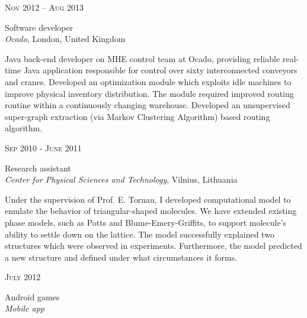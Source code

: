 \documentclass[10pt]{article} %
\begin{document}
{\begin{minipage}[t]{0.5\textwidth}

{\raggedleft\textsc{Nov 2012 – Aug 2013}\par}

{\raggedright\large Software developer\\
\textit{Ocado}, London, United Kingdom\\[5pt]}

\normalsize{Java back-end developer on MHE control team at Ocado, 
providing reliable real-time Java application responsible for 
control over sixty interconnected conveyors and cranes. 
Developed an optimization module which exploits idle machines 
to improve physical inventory distribution. 
The module required improved routing routine within a continuously changing warehouse. 
Developed an unsupervised super-graph extraction 
(via Markov Clustering  Algorithm) based routing algorithm.}\\


{\raggedleft\textsc{Sep 2010 - June 2011}\par}

{\raggedright\large Research assistant\\
\textit{Center for Physical Sciences and Technology}, Vilnius, Lithuania\\[5pt]}

\normalsize{Under the supervision of Prof. E. Tornau, 
I developed computational model to emulate the behavior 
of triangular-shaped molecules. We have extended existing 
phase models, such as Potts and Blume-Emery-Griffits, 
to support molecule's ability to settle down on the lattice. 
The model successfully explained two structures which were observed in experiments. 
Furthermore, the model predicted a new structure and defined under what circumstances it forms.}\\



{\raggedleft\textsc{July 2012}\par}

{\raggedright\large Android games\\
\textit{Mobile app}\\[5pt]}


\end{minipage}}
\end{document}
